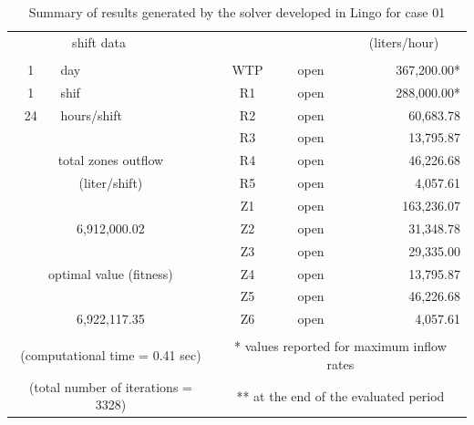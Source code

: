 \documentclass{singlecol}
\theoremstyle{TH}{
\newtheorem{lemma}{Lemma}
\newtheorem{theorem}[lemma]{Theorem}
\newtheorem{corrolary}[lemma]{Corrolary}
\newtheorem{conjecture}[lemma]{Conjecture}
\newtheorem{proposition}[lemma]{Proposition}
\newtheorem{claim}[lemma]{Claim}
\newtheorem{stheorem}[lemma]{Wrong Theorem}
\newtheorem{algorithm}{Algorithm}
}
\theoremstyle{THrm}{
\newtheorem{definition}{Definition}[section]
\newtheorem{question}{Question}[section]
\newtheorem{remark}{Remark}
\newtheorem{scheme}{Scheme}
}
\theoremstyle{THhit}{
\newtheorem{case}{Case}[section]
}
\begin{document}
\begin{table}[t]
\begin{center}
\begin{small}
\begin{tabular}{ c r r r r r }
		\multicolumn{2}{c}{shift data}     &   &      & \multicolumn{1}{c}{} & \multicolumn{1}{c}{(liters/hour)} \\
		   \\
		1   &  \multicolumn{1}{l}{day}   &              		& \multicolumn{1}{c}{WTP}    & \multicolumn{1}{c}{open} &  367,200.00* \\
		1   &  \multicolumn{1}{l}{shif}  &         			    & \multicolumn{1}{c}{R1}     & \multicolumn{1}{c}{open} &  288,000.00* \\
		24  &  \multicolumn{1}{l}{hours/shift}        &         & \multicolumn{1}{c}{R2}     & \multicolumn{1}{c}{open} &    60,683.78 \\
	   &      &              									& \multicolumn{1}{c}{R3}     & \multicolumn{1}{c}{open} &    13,795.87 \\
	   \multicolumn{3}{c}{total zones outflow}                  & \multicolumn{1}{c}{R4}     & \multicolumn{1}{c}{open} &    46,226.68 \\
	   \multicolumn{3}{c}{(liter/shift)}              			& \multicolumn{1}{c}{R5}     & \multicolumn{1}{c}{open} &     4,057.61 \\
	   &      &              									& \multicolumn{1}{c}{Z1}     & \multicolumn{1}{c}{open} &   163,236.07 \\
	   \multicolumn{3}{c}{6,912,000.02}              			& \multicolumn{1}{c}{Z2}     & \multicolumn{1}{c}{open} &    31,348.78 \\
	      &              &              						& \multicolumn{1}{c}{Z3}     & \multicolumn{1}{c}{open} &    29,335.00 \\
	   \multicolumn{3}{c}{optimal value (fitness)}              & \multicolumn{1}{c}{Z4}     & \multicolumn{1}{c}{open} &    13,795.87 \\
	   &             &             						 		& \multicolumn{1}{c}{Z5}     & \multicolumn{1}{c}{open} &    46,226.68 \\
	   \multicolumn{3}{c}{6,922,117.35}              			& \multicolumn{1}{c}{Z6}     & \multicolumn{1}{c}{open} &     4,057.61 \\
	   \\
	   \multicolumn{3}{c}{(computational time  = 0.41 sec)}     & \multicolumn{3}{c}{* values reported for maximum inflow rates} \\
	   \multicolumn{3}{c}{(total number of iterations = 3328)}   & \multicolumn{3}{c}{** at the end of the evaluated period} 
	\end{tabular}
		\end{small}
\caption{Summary of results generated by the solver developed in Lingo for case 01}
\label{tab:lingoEvalCase01}
\end{center}
\end{table}
\end{document}
